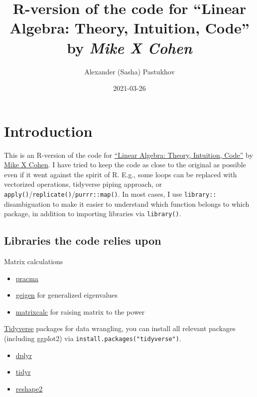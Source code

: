 \documentclass[
]{book}
\title{R-version of the code for ``Linear Algebra: Theory, Intuition, Code'' by \emph{Mike X Cohen}}
\author{Alexander (Sasha) Pastukhov}
\date{2021-03-26}
\providecommand{\tightlist}{%
  \setlength{\itemsep}{0pt}\setlength{\parskip}{0pt}}
\begin{document}
\maketitle

{
\setcounter{tocdepth}{1}
\tableofcontents
}
\hypertarget{introduction}{%
\chapter*{Introduction}\label{introduction}}

This is an R-version of the code for \href{https://www.amazon.com/Linear-Algebra-Theory-Intuition-Code/dp/9083136604}{``Linear Algebra: Theory, Intuition, Code''} by \href{http://www.mikexcohen.com/}{Mike X Cohen}. I have tried to keep the code as close to the original as possible even if it went against the spirit of R. E.g., some loops can be replaced with vectorized operations, tidyverse piping approach, or \texttt{apply()}/\texttt{replicate()}/\texttt{purrr::map()}. In most cases, I use \texttt{library::} disambiguation to make it easier to understand which function belongs to which package, in addition to importing libraries via \texttt{library()}.

\hypertarget{libraries-the-code-relies-upon}{%
\section*{Libraries the code relies upon}\label{libraries-the-code-relies-upon}}

Matrix calculations

\begin{itemize}
\tightlist
\item
  \href{https://rdrr.io/cran/pracma/}{pracma}
\item
  \href{https://rdrr.io/cran/geigen/}{geigen} for generalized eigenvalues
\item
  \href{https://rdrr.io/cran/matrixcalc/}{matrixcalc} for raising matrix to the power
\end{itemize}

\href{https://tidyverse.org/}{Tidyverse} packages for data wrangling, you can install all relevant packages (including ggplot2) via \texttt{install.packages("tidyverse")}.

\begin{itemize}
\tightlist
\item
  \href{https://dplyr.tidyverse.org/}{dplyr}
\item
  \href{https://tidyr.tidyverse.org/}{tidyr}
\item
  \href{https://www.rdocumentation.org/packages/reshape2/versions/1.4.4}{reshape2}
\end{itemize}
\end{document}

